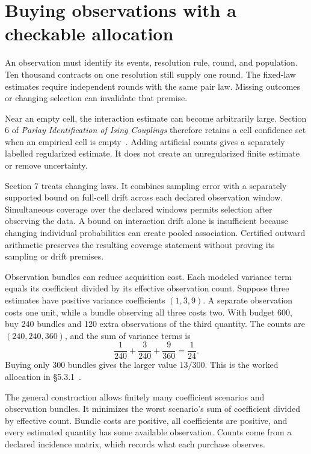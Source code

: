 \documentclass{momentum}
\begin{document}
\section{Buying observations with a checkable allocation}

An observation must identify its events, resolution rule, round, and population. Ten thousand contracts on one resolution still supply one round. The fixed-law estimates require independent rounds with the same pair law. Missing outcomes or changing selection can invalidate that premise.

Near an empty cell, the interaction estimate can become arbitrarily large. Section 6 of \emph{Parlay Identification of Ising Couplings} therefore retains a cell confidence set when an empirical cell is empty~\cite{parlay}. Adding artificial counts gives a separately labelled regularized estimate. It does not create an unregularized finite estimate or remove uncertainty.

Section 7 treats changing laws. It combines sampling error with a separately supported bound on full-cell drift across each declared observation window. Simultaneous coverage over the declared windows permits selection after observing the data. A bound on interaction drift alone is insufficient because changing individual probabilities can create pooled association. Certified outward arithmetic preserves the resulting coverage statement without proving its sampling or drift premises.

Observation bundles can reduce acquisition cost. Each modeled variance term equals its coefficient divided by its effective observation count. Suppose three estimates have positive variance coefficients $(1,3,9)$. A separate observation costs one unit, while a bundle observing all three costs two. With budget 600, buy 240 bundles and 120 extra observations of the third quantity. The counts are $(240,240,360)$, and the sum of variance terms is
\[
\frac1{240}+\frac3{240}+\frac9{360}=\frac1{24}.
\]
Buying only 300 bundles gives the larger value $13/300$. This is the worked allocation in \S5.3.1~\cite{parlay}.

The general construction allows finitely many coefficient scenarios and observation bundles. It minimizes the worst scenario's sum of coefficient divided by effective count. Bundle costs are positive, all coefficients are positive, and every estimated quantity has some available observation. Counts come from a declared incidence matrix, which records what each purchase observes.
\end{document}
